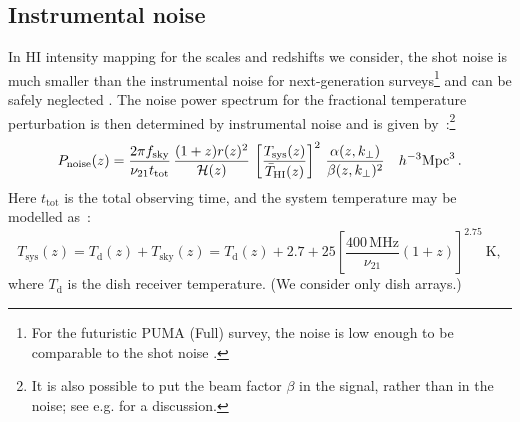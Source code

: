 \subsection{Instrumental noise}\label{ssec:inoise}
%
In HI intensity mapping for the scales and redshifts we consider, the shot noise is much smaller than the instrumental noise for next-generation surveys\footnote{{For the futuristic PUMA (Full) survey, the noise is low enough to be comparable to the shot noise \cite{Chen:2018qiu}.}} and can be safely neglected \cite{Castorina:2016bfm,Villaescusa-Navarro:2018vsg}. 
The noise power spectrum for the fractional temperature perturbation is then determined by instrumental noise and is given by~\cite{Bull:2014rha,Alonso:2017dgh}:\footnote{It is also possible to put the beam factor $\beta$ in the signal, rather than in the noise; see e.g. \cite{Bernal:2019jdo} for a discussion.}
\begin{equation}
{P}_{\mathrm{noise}}(z) = \frac{2\pi f_{\mathrm{sky}}}{\nu_{21} t_{\mathrm{tot}}} \, \frac{(1+z) r(z)^{2} }{\mathcal{H}(z) }\,\left[\frac{T_{\mathrm{sys}}(z)}{\bar{T}_{{\mathrm{HI}}}(z)}\right]^2\, \frac{\alpha(z,k_\perp)}{\beta(z,k_\perp)^2}
~~~ h^{-3}\mathrm{Mpc}^{3} \,. 
\label{e2.24}
\end{equation}
Here $t_\mathrm{tot}$ is the total observing time, and  the system temperature may be modelled as~\citep{Ansari:2018ury}:
\begin{equation}
T_{\mathrm{sys}}(z) = T_\mathrm{d}(z)+T_\mathrm{sky}(z) =T_\mathrm{d}(z) + 2.7 + 25\left[\frac{400\,\mathrm{MHz}}{\nu_{21}} (1+z)\right]^{2.75} ~ \mathrm{K}, \label{e2.25}
\end{equation} 
where $T_\mathrm{d}$ is the dish receiver temperature. (We consider only dish arrays.)


